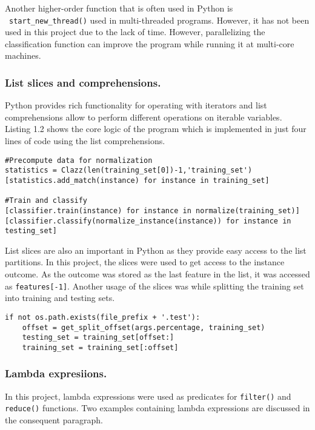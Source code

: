 \documentclass{llncs}
\begin{document}
Another higher-order function that is often used in Python is ~\lstinline{start_new_thread()} used in multi-threaded programs. However, it has not been used in this project due to the lack of time. However, parallelizing the classification function can improve the program while running it at multi-core machines.

\subsubsection{List slices and comprehensions.}

Python provides rich functionality for operating with iterators and list comprehensions allow to perform different operations on iterable variables. Listing 1.2 shows the core logic of the program which is implemented in just four lines of code using the list comprehensions.

\begin{lstlisting}[caption = Core logic of the application.]
#Precompute data for normalization
statistics = Clazz(len(training_set[0])-1,'training_set')
[statistics.add_match(instance) for instance in training_set]

#Train and classify
[classifier.train(instance) for instance in normalize(training_set)]
[classifier.classify(normalize_instance(instance)) for instance in testing_set]
\end{lstlisting}

List slices are also an important in Python as they provide easy access to the list partitions. In this project, the slices were used to get access to the instance outcome. As the outcome was stored as the last feature in the list, it was accessed as \lstinline{features[-1]}. Another usage of the slices was while splitting the training set into training and testing sets. 

\begin{lstlisting}[caption = Splitting training set.]
if not os.path.exists(file_prefix + '.test'):
	offset = get_split_offset(args.percentage, training_set)
    testing_set = training_set[offset:]
    training_set = training_set[:offset]
\end{lstlisting}

\subsubsection{Lambda expresiions.} In this project, lambda expressions were used as predicates for \lstinline{filter()} and \lstinline{reduce()} functions. Two examples containing lambda expressions are discussed in the consequent paragraph.
\end{document}
